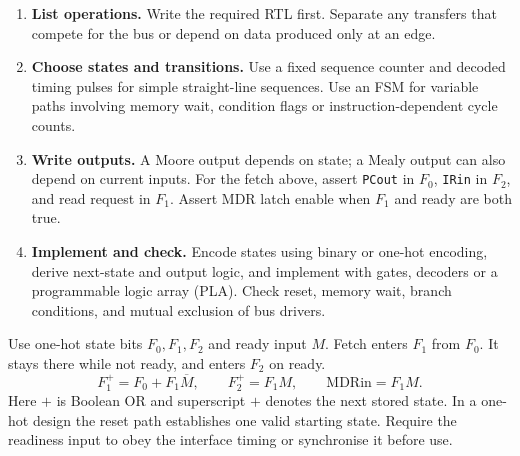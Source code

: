 \documentclass[12pt,a4paper]{article}
\begin{document}
\begin{enumerate}[leftmargin=*,itemsep=3pt]
\item \textbf{List operations.} Write the required RTL first. Separate any transfers that compete for the bus or depend on data produced only at an edge.
\item \textbf{Choose states and transitions.} Use a fixed sequence counter and decoded timing pulses for simple straight-line sequences. Use an FSM for variable paths involving memory wait, condition flags or instruction-dependent cycle counts.
\item \textbf{Write outputs.} A Moore output depends on state; a Mealy output can also depend on current inputs. For the fetch above, assert \texttt{PCout} in $F_0$, \texttt{IRin} in $F_2$, and read request in $F_1$. Assert MDR latch enable when $F_1$ and ready are both true.
\item \textbf{Implement and check.} Encode states using binary or one-hot encoding, derive next-state and output logic, and implement with gates, decoders or a programmable logic array (PLA). Check reset, memory wait, branch conditions, and mutual exclusion of bus drivers.
\end{enumerate}
\begin{tcolorbox}[tikzbox,title={Hardwired control inputs, state and outputs},unbreakable]
\centering
{}
\end{tcolorbox}

\begin{tcolorbox}[examplebox,title={Derive a state equation with a memory wait}]
Use one-hot state bits $F_0,F_1,F_2$ and ready input $M$. Fetch enters $F_1$ from $F_0$. It stays there while not ready, and enters $F_2$ on ready.
\[
 F_1^{+}=F_0+F_1\overline M,\qquad
 F_2^{+}=F_1M,\qquad
 \mathrm{MDRin}=F_1M .
\]
Here $+$ is Boolean OR and superscript $+$ denotes the next stored state. In a one-hot design the reset path establishes one valid starting state. Require the readiness input to obey the interface timing or synchronise it before use.
\end{tcolorbox}
\end{document}
